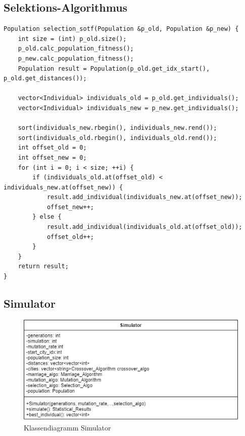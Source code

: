 \subsection{Selektions-Algorithmus}
\begin{minipage}{\linewidth}
\begin{lstlisting}[caption={Survival-Of-The-Fittest-Selektions-Algorithmus}, firstnumber=1, captionpos=b, label=lst:selektion]
Population selection_sotf(Population &p_old, Population &p_new) {
	int size = (int) p_old.size();
	p_old.calc_population_fitness();
	p_new.calc_population_fitness();
	Population result = Population(p_old.get_idx_start(), p_old.get_distances());

	vector<Individual> individuals_old = p_old.get_individuals();
	vector<Individual> individuals_new = p_new.get_individuals();

	sort(individuals_new.rbegin(), individuals_new.rend());
	sort(individuals_old.rbegin(), individuals_old.rend());
	int offset_old = 0;
	int offset_new = 0;
	for (int i = 0; i < size; ++i) {
		if (individuals_old.at(offset_old) < individuals_new.at(offset_new)) {
			result.add_individual(individuals_new.at(offset_new));
			offset_new++;
		} else {
			result.add_individual(individuals_old.at(offset_old));
 			offset_old++;
		}
	}
	return result;
}
\end{lstlisting}
\end{minipage}
\subsection{Simulator}

\begin{figure}[H]
\centering
\includegraphics[width=1\textwidth]{img/Vortrag/simulator.png}
\caption{Klassendiagramm Simulator}
\label{fig:simulator}
\end{figure}

